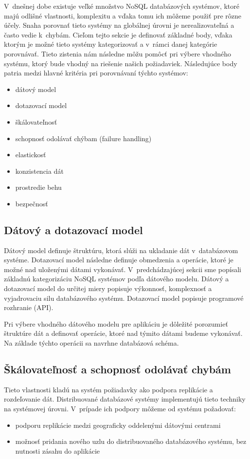 \documentclass[11pt,twoside,a4paper]{book}
\begin{document}
V~dnešnej dobe existuje veľké množstvo NoSQL databázových systémov, ktoré majú odlišné vlastnosti, komplexitu a vďaka tomu ich môžeme použiť pre rôzne účely. Snaha porovnať tieto systémy na globálnej úrovni je nerealizovateľná a často vedie k~chybám. Cieľom tejto sekcie je definovať základné body, vďaka ktorým je možné tieto systémy kategorizovať a v~rámci danej kategórie porovnávať. Tieto zistenia nám následne môžu pomôcť pri výbere vhodného systému, ktorý bude vhodný na riešenie našich požiadaviek. Následujúce body patria medzi hlavné kritéria pri porovnávaní týchto systémov:
\begin{itemize}
 \item
  dátový model
 \item 
  dotazovací model
 \item
  škálovateľnosť
 \item 
  schopnosť odolávať chýbam (failure handling)
 \item
  elastickosť
 \item 
  konzistencia dát
 \item
  prostredie behu
 \item 
  bezpečnosť 
\end{itemize}


\subsection{Dátový a dotazovací model}
Dátový model definuje štruktúru, ktorá slúži na ukladanie dát v~databázovom systéme. Dotazovací model následne definuje obmedzenia a operácie, ktoré je možné nad uloženými dátami vykonávať. V~predchádzajúcej sekcii sme popísali základnú kategorizáciu NoSQL systémov podľa dátového modelu. Dátový a dotazovací model do určitej miery popisuje výkonnosť, komplexnosť a vyjadrovaciu silu databázového systému. Dotazovací model popisuje programové rozhranie (API).

Pri výbere vhodného dátového modelu pre aplikáciu je dôležité porozumieť štruktúre dát a definovať operácie, ktoré nad týmito dátami budeme vykonávať. Na základe týchto operácii sa navrhne databázová schéma.


\subsection{Škálovateľnosť a schopnosť odolávať chybám}
Tieto vlastnosti kladú na systém požiadavky ako podpora replikácie a rozdeľovanie dát. Distribuované databázové systémy implementujú tieto techniky na systémovej úrovni. V~prípade ich podpory môžeme od systému požadovať:
\begin{itemize}
  \item
  podporu replikácie medzi geograficky oddelenými dátovými centrami
  \item
  možnosť pridania nového uzlu do distribuovaného databázového systému, bez nutnosti zásahu do aplikácie
\end{itemize}
\end{document}
